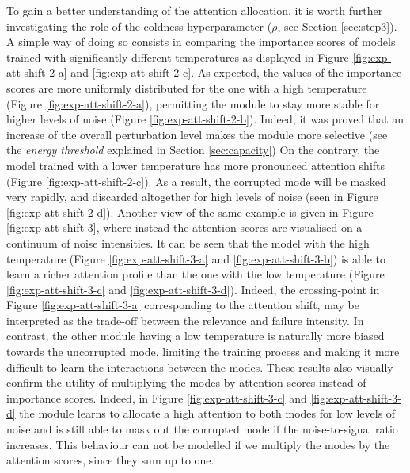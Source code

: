 To gain a better understanding of the attention allocation, it is worth further investigating the role of the coldness hyperparameter ($\rho$, see Section \ref{sec:step3}). A simple way of doing so consists in comparing the importance scores of models trained with significantly different temperatures as displayed in Figure \ref{fig:exp-att-shift-2-a} and \ref{fig:exp-att-shift-2-c}. As expected, the values of the importance scores are more uniformly distributed for the one with a high temperature (Figure \ref{fig:exp-att-shift-2-a}), permitting the module to stay more stable for higher levels of noise (Figure \ref{fig:exp-att-shift-2-b}). Indeed, it was proved that an increase of the overall perturbation level makes the module more selective (see the \textit{energy threshold} explained in Section \ref{sec:capacity}) On the contrary, the model trained with a lower temperature has more pronounced attention shifts (Figure \ref{fig:exp-att-shift-2-c}). As a result, the corrupted mode will be masked very rapidly, and discarded altogether for high levels of noise (seen in Figure \ref{fig:exp-att-shift-2-d}). Another view of the same example is given in Figure \ref{fig:exp-att-shift-3}, where instead the attention scores are visualised on a continuum of noise intensities. It can be seen that the model with the high temperature (Figure \ref{fig:exp-att-shift-3-a} and \ref{fig:exp-att-shift-3-b}) is able to learn a richer attention profile than the one with the low temperature (Figure \ref{fig:exp-att-shift-3-c} and \ref{fig:exp-att-shift-3-d}). Indeed, the crossing-point in Figure \ref{fig:exp-att-shift-3-a} corresponding to the attention shift, may be interpreted as the trade-off between the relevance and failure intensity. In contrast, the other module having a low temperature is naturally more biased towards the uncorrupted mode, limiting the training process and making it more difficult to learn the interactions between the modes. These results also visually confirm the utility of multiplying the modes by attention scores instead of importance scores. Indeed, in Figure \ref{fig:exp-att-shift-3-c} and \ref{fig:exp-att-shift-3-d} the module learns to allocate a high attention to both modes for low levels of noise and is still able to mask out the corrupted mode if the noise-to-signal ratio increases. This behaviour can not be modelled if we multiply the modes by the attention scores, since they sum up to one.
